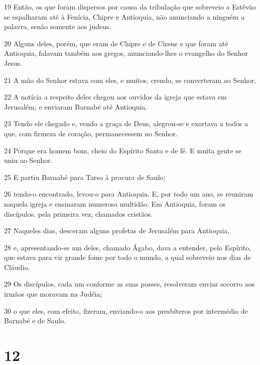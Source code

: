 \par 19 Então, os que foram dispersos por causa da tribulação que sobreveio a Estêvão se espalharam até à Fenícia, Chipre e Antioquia, não anunciando a ninguém a palavra, senão somente aos judeus.
\par 20 Alguns deles, porém, que eram de Chipre e de Cirene e que foram até Antioquia, falavam também aos gregos, anunciando-lhes o evangelho do Senhor Jesus.
\par 21 A mão do Senhor estava com eles, e muitos, crendo, se converteram ao Senhor.
\par 22 A notícia a respeito deles chegou aos ouvidos da igreja que estava em Jerusalém; e enviaram Barnabé até Antioquia.
\par 23 Tendo ele chegado e, vendo a graça de Deus, alegrou-se e exortava a todos a que, com firmeza de coração, permanecessem no Senhor.
\par 24 Porque era homem bom, cheio do Espírito Santo e de fé. E muita gente se uniu ao Senhor.
\par 25 E partiu Barnabé para Tarso à procura de Saulo;
\par 26 tendo-o encontrado, levou-o para Antioquia. E, por todo um ano, se reuniram naquela igreja e ensinaram numerosa multidão. Em Antioquia, foram os discípulos, pela primeira vez, chamados cristãos.
\par 27 Naqueles dias, desceram alguns profetas de Jerusalém para Antioquia,
\par 28 e, apresentando-se um deles, chamado Ágabo, dava a entender, pelo Espírito, que estava para vir grande fome por todo o mundo, a qual sobreveio nos dias de Cláudio.
\par 29 Os discípulos, cada um conforme as suas posses, resolveram enviar socorro aos irmãos que moravam na Judéia;
\par 30 o que eles, com efeito, fizeram, enviando-o aos presbíteros por intermédio de Barnabé e de Saulo.

\chapter{12}


